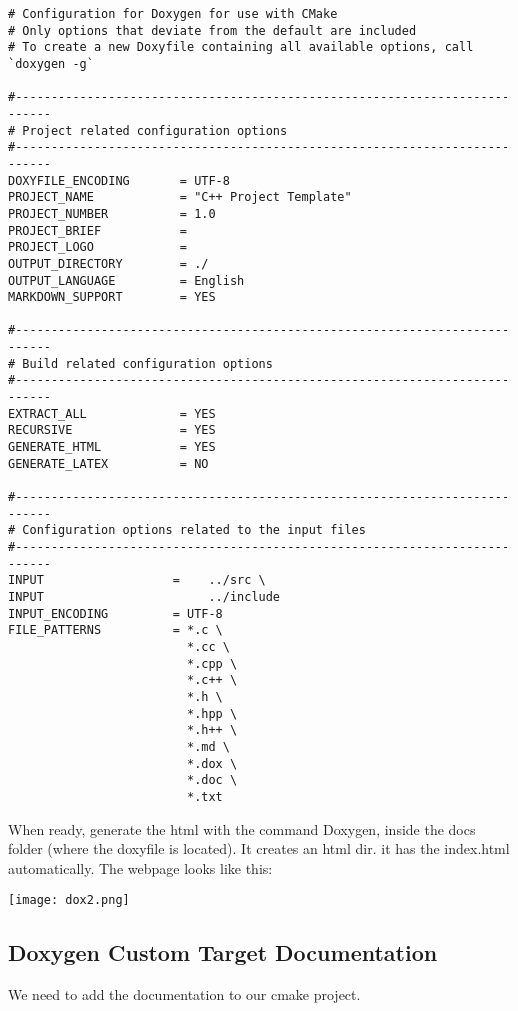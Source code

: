 \begin{verbatim}
# Configuration for Doxygen for use with CMake
# Only options that deviate from the default are included
# To create a new Doxyfile containing all available options, call `doxygen -g`

#---------------------------------------------------------------------------
# Project related configuration options
#---------------------------------------------------------------------------
DOXYFILE_ENCODING       = UTF-8
PROJECT_NAME            = "C++ Project Template"
PROJECT_NUMBER          = 1.0
PROJECT_BRIEF           =
PROJECT_LOGO            =
OUTPUT_DIRECTORY        = ./
OUTPUT_LANGUAGE         = English
MARKDOWN_SUPPORT        = YES

#---------------------------------------------------------------------------
# Build related configuration options
#---------------------------------------------------------------------------
EXTRACT_ALL             = YES
RECURSIVE               = YES
GENERATE_HTML           = YES
GENERATE_LATEX          = NO

#---------------------------------------------------------------------------
# Configuration options related to the input files
#---------------------------------------------------------------------------
INPUT                  =    ../src \
INPUT                       ../include
INPUT_ENCODING         = UTF-8
FILE_PATTERNS          = *.c \
                         *.cc \
                         *.cpp \
                         *.c++ \
                         *.h \
                         *.hpp \
                         *.h++ \
                         *.md \
                         *.dox \
                         *.doc \
                         *.txt
\end{verbatim}

When ready, generate the html with the command Doxygen, inside the docs folder (where the doxyfile is located). It creates an html dir.
it has the index.html automatically. The webpage looks like this:


\begin{center}
    \texttt{[image: dox2.png]}
\end{center}


\subsection{Doxygen Custom Target Documentation}

We need to add the documentation to our cmake project.

